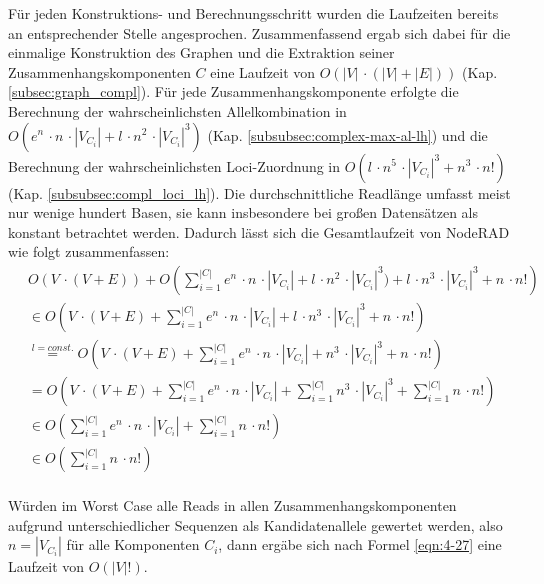 Für jeden Konstruktions- und Berechnungsschritt wurden die Laufzeiten bereits an entsprechender Stelle angesprochen. Zusammenfassend ergab sich dabei für die einmalige Konstruktion des Graphen und die Extraktion seiner Zusammenhangskomponenten $ C $ eine Laufzeit von $O(|V| \, \cdotp (|V| + |E|)) $ (Kap. \ref{subsec:graph_compl}). Für jede Zusammenhangskomponente erfolgte die Berechnung der wahrscheinlichsten Allelkombination in $ O( e^n\, \cdotp n\, \cdotp |V_{C_{i}}| + l\, \cdotp n^2\, \cdotp |V_{C_{i}}|^3) $ (Kap. \ref{subsubsec:complex-max-al-lh}) und die Berechnung der wahrscheinlichsten Loci-Zuordnung in $O( l\, \cdotp n^5  \, \cdotp |V_{C_{i}}|^3 + n^3  \, \cdotp n!)$ (Kap. \ref{subsubsec:compl_loci_lh}). Die durchschnittliche Readlänge umfasst meist nur wenige hundert Basen, sie kann insbesondere bei großen Datensätzen als konstant betrachtet werden. Dadurch lässt sich die Gesamtlaufzeit von NodeRAD wie folgt zusammenfassen:
\begin{equation} \label{eqn:4-26}
\tag{4-26}
\begin{aligned}
&\ {}O(V \, \cdotp (V + E)) + O\left( \sum_{i=1}^{|C|} e^n\, \cdotp n\, \cdotp |V_{C_{i}}| + l\, \cdotp n^2\, \cdotp |V_{C_{i}}|^3) + l\, \cdotp n^3  \, \cdotp |V_{C_{i}}|^3 + n  \, \cdotp n! \right) \\
&\ \in O\left( V \, \cdotp (V + E) + \sum_{i=1}^{|C|} e^n\, \cdotp n\, \cdotp |V_{C_{i}}| + l\, \cdotp n^3  \, \cdotp |V_{C_{i}}|^3 + n  \, \cdotp n! \right) \\
&\ \stackrel{l = const.}{=} O\left( V \, \cdotp (V + E) + \sum_{i=1}^{|C|} e^n\, \cdotp n\, \cdotp |V_{C_{i}}| + n^3  \, \cdotp |V_{C_{i}}|^3 + n  \, \cdotp n! \right) \\
&\ = O\left( V \, \cdotp (V + E) + \sum_{i=1}^{|C|} e^n\, \cdotp n\, \cdotp |V_{C_{i}}| + \sum_{i=1}^{|C|} n^3  \, \cdotp |V_{C_{i}}|^3 + \sum_{i=1}^{|C|} n  \, \cdotp n! \right) \\
&\ \in O\left(\sum_{i=1}^{|C|} e^n\, \cdotp n\, \cdotp |V_{C_{i}}| + \sum_{i=1}^{|C|} n  \, \cdotp n! \right) \\
&\ \in O\left(\sum_{i=1}^{|C|} n  \, \cdotp n! \right) \\
\end{aligned}
\end{equation}

Würden im Worst Case alle Reads in allen Zusammenhangskomponenten aufgrund unterschiedlicher Sequenzen als Kandidatenallele gewertet werden, also $n = |V_{C_{i}}|$ für alle Komponenten $C_{i}$, dann ergäbe sich nach Formel \eqref{eqn:4-27} eine Laufzeit von $O(|V|!)$. 

